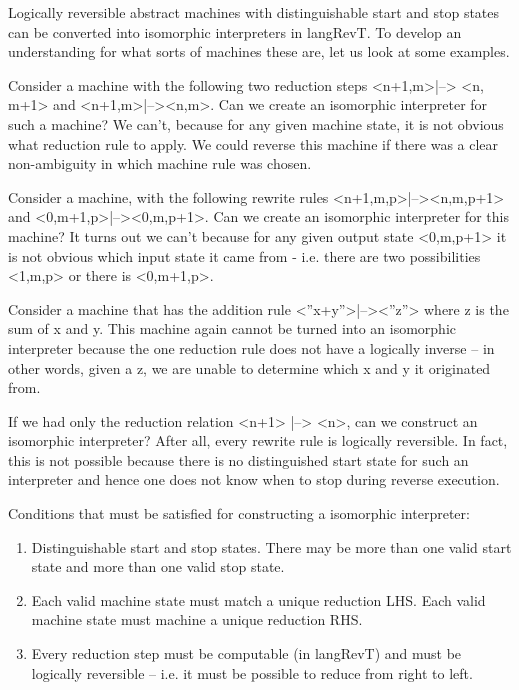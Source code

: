 \documentclass{llncs}
\begin{document}
Logically reversible abstract machines with distinguishable start and
stop states can be converted into isomorphic interpreters in
{{langRevT}}.  To develop an understanding for what sorts of machines
these are, let us look at some examples.

Consider a machine with the following two reduction steps
{{<n+1,m>|--> <n, m+1>}} and {{<n+1,m>|--><n,m>}}. Can we create an
isomorphic interpreter for such a machine? We can't, because for any
given machine state, it is not obvious what reduction rule to
apply. We could reverse this machine if there was a clear
non-ambiguity in which machine rule was chosen.

Consider a machine, with the following rewrite rules
{{<n+1,m,p>|--><n,m,p+1>}} and {{<0,m+1,p>|--><0,m,p+1>}}. Can we
create an isomorphic interpreter for this machine? It turns out we
can't because for any given output state {{<0,m,p+1>}} it is not
obvious which input state it came from - i.e. there are two
possibilities {{<1,m,p>}} or there is {{<0,m+1,p>}}.

Consider a machine that has the addition rule {{<''x+y''>|--><''z''>}}
where {{z}} is the sum of {{x}} and {{y}}. This machine again cannot
be turned into an isomorphic interpreter because the one reduction
rule does not have a logically inverse -- in other words, given a
{{z}}, we are unable to determine which {{x}} and {{y}} it originated
from.

If we had only the reduction relation {{<n+1> |--> <n>}}, can we
construct an isomorphic interpreter? After all, every rewrite rule is
logically reversible. In fact, this is not possible because there is
no distinguished start state for such an interpreter and hence one
does not know when to stop during reverse execution.

\noindent
Conditions that must be satisfied for constructing a isomorphic
interpreter:

\begin{enumerate}

\item Distinguishable start and stop states. There may be more than one
  valid start state and more than one valid stop state.

\item Each valid machine state must match a unique reduction LHS. Each
  valid machine state must machine a unique reduction RHS.

\item Every reduction step must be computable (in {{langRevT}}) and
  must be logically reversible -- i.e. it must be possible to reduce
  from right to left.

\end{enumerate}
\end{document}
